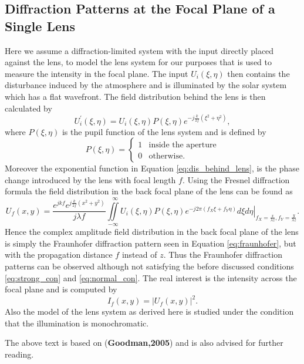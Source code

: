 \subsection{Diffraction Patterns at the Focal Plane of a Single Lens}
Here we assume a diffraction-limited system with the input directly placed against the lens, to model the lens system for our purposes that is used to measure the intensity in the focal plane. The input $U_i(\xi,\eta)$ then contains the disturbance induced by the atmosphere and is illuminated by the solar system which has a flat wavefront. The field distribution behind the lens is then calculated by
\begin{equation}
U^\prime_i(\xi,\eta)=U_i(\xi,\eta)P(\xi,\eta)e^{-j\frac{k}{2f}(\xi^2 + \eta^2)},
\label{eq:dis_behind_lens}
\end{equation}
where $P(\xi,\eta)$ is the pupil function of the lens system and is defined by
\begin{equation}
P(\xi,\eta)= \begin{cases} 1 & \text{inside the aperture} \\ 0 & \text{otherwise.} \end{cases}
\label{PupilFunction}
\end{equation}
Moreover the exponential function in Equation \eqref{eq:dis_behind_lens}, is the phase change introduced by the lens with focal length $f$. Using the Fresnel diffraction formula the field distribution in the back focal plane of the lens can be found as
\begin{equation}
U_f(x,y)=\frac{e^{jkf}e^{j\frac{k}{2f}(x^2+y^2)}}{j\lambda f}\iint\limits_{-\infty}^{~~~\infty} \left. U_i(\xi,\eta)P(\xi,\eta)e^{-j2\pi(f_X\xi+f_Y\eta)}d\xi d\eta \right|_{f_X=\frac{x}{\lambda z},f_Y=\frac{y}{\lambda z}}.
\end{equation}
Hence the complex amplitude field distribution in the back focal plane of the lens is simply the Fraunhofer diffraction pattern seen in Equation \eqref{eq:fraunhofer}, but with the propagation distance $f$ instead of $z$. Thus the Fraunhofer diffraction patterns can be observed although not satisfying the before discussed conditions \eqref{eq:strong_con} and \eqref{eq:normal_con}. The real interest is the intensity across the focal plane and is computed by
\begin{equation}
I_f(x,y)=|U_f(x,y)|^2.
\end{equation}
Also the model of the lens system as derived here is studied under the condition that the illumination is monochromatic. 


The above text is based on (\textbf{Goodman,2005}) and is also advised for further reading.